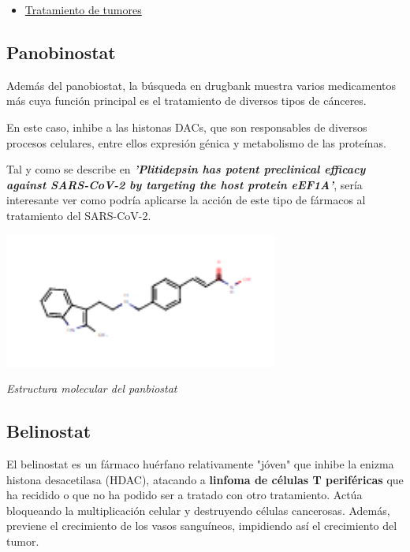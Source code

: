 \begin{itemize}
    \item \underline{Tratamiento de tumores}
\end{itemize}

\subsection{Panobinostat}

Además del panobiostat, la búsqueda en drugbank muestra varios medicamentos más cuya función principal es el tratamiento de diversos tipos de cánceres.

En este caso, inhibe a las histonas DACs, que son responsables de diversos procesos celulares, entre ellos expresión génica y metabolismo de las proteínas.

Tal y como se describe en \cite{White2021PlitidepsinEEF1A.}\textbf{\textit{'Plitidepsin has potent preclinical efficacy against SARS-CoV-2 by targeting the host protein eEF1A'}}, sería interesante ver como podría aplicarse la acción de este tipo de fármacos al tratamiento del SARS-CoV-2.

\begin{center}

\includegraphics[width=90mm,scale=1]{report/figures/panobiostat.PNG}


\caption{\textit{Estructura molecular del panbiostat}}

\end{center}

\subsection{Belinostat}

El belinostat es un fármaco huérfano relativamente "jóven" que inhibe la enizma histona desacetilasa (HDAC), atacando a \textbf{linfoma de células T periféricas} que ha recidido o que no ha podido ser a tratado con otro tratamiento. Actúa bloqueando la multiplicación celular y destruyendo células cancerosas.
Además, previene el crecimiento de los vasos sanguíneos, impidiendo así el crecimiento del tumor.\newline


